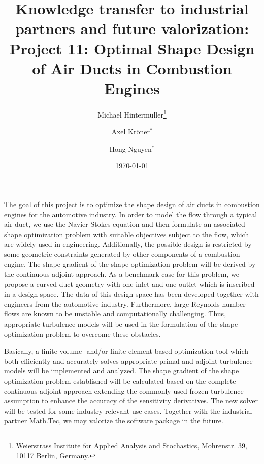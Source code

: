 \documentclass{article}
\title{Knowledge transfer to industrial partners and future valorization:\\
Project 11: Optimal Shape Design of Air Ducts in Combustion Engines}
\author{Michael Hinterm\"uller\thanks{Weierstrass Institute for Applied Analysis and Stochastics, Mohrenstr. 39, 10117 Berlin, Germany.} \and Axel Kr\"oner${}^*$ \and Hong Nguyen${}^*$}
\date{\today}
\numberwithin{equation}{section}
\begin{document}
\maketitle

The goal of this project is to optimize the shape design of air ducts in combustion engines for the automotive industry. In order to model the flow through a typical air duct, we use the Navier-Stokes equation and then formulate an associated shape optimization problem with suitable objectives subject to the flow, which are widely used in engineering. Additionally, the possible design is restricted by some geometric constraints generated by other components of a combustion engine. The shape gradient of the shape optimization problem will be derived by the continuous adjoint approach. As a benchmark case for this problem, we propose a curved duct geometry with one inlet and one outlet which is inscribed in a design space. The data of this design space has been developed together with engineers from the automotive industry. Furthermore, large Reynolds number flows are known to be unstable and computationally challenging. Thus, appropriate turbulence models will be used in the formulation of the shape optimization problem to overcome these obstacles.

Basically, a finite volume- and/or finite element-based optimization tool which both efficiently and accurately solves appropriate primal and adjoint turbulence models will be implemented and analyzed. The shape gradient of the shape optimization problem established will be calculated based on the complete continuous adjoint approach extending the commonly used frozen turbulence assumption to enhance the accuracy of the sensitivity derivatives. The new solver will be tested for some industry relevant use cases. Together with the industrial partner Math.Tec, we may valorize the software package in the future.


\printbibliography[heading=bibintoc]
\end{document}

